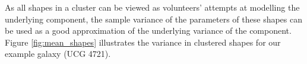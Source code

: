 \documentclass[../main.tex]{subfiles}
\begin{document}
As all shapes in a cluster can be viewed as volunteers' attempts at modelling the underlying component, the sample variance of the parameters of these shapes can be used as a good approximation of the underlying variance of the component. Figure \ref{fig:mean_shapes} illustrates the variance in clustered shapes for our example galaxy (UCG 4721). 
\end{document}
